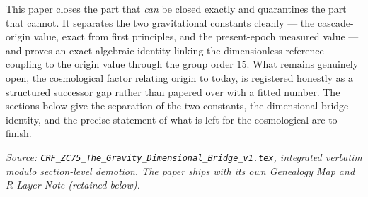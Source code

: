 \documentclass[12pt, a4paper]{article}
\renewcommand{\aEM}{\alpha_{\rm EM}}
\begin{document}
This paper closes the part that \emph{can} be closed exactly and quarantines
the part that cannot. It separates the two gravitational constants cleanly ---
the cascade-origin value, exact from first principles, and the present-epoch
measured value --- and proves an exact algebraic identity linking the
dimensionless reference coupling to the origin value through the group order
$15$. What remains genuinely open, the cosmological factor relating origin to
today, is registered honestly as a structured successor gap rather than
papered over with a fitted number. The sections below give the separation of
the two constants, the dimensional bridge identity, and the precise statement
of what is left for the cosmological arc to finish.
\label{sec:zc75}

\noindent
\textit{Source: \texttt{CRF\_ZC75\_The\_Gravity\_Dimensional\_Bridge\_v1.tex}, integrated verbatim modulo
section-level demotion. The paper ships with its own Genealogy Map
and R-Layer Note (retained below).}

\medskip

\sloppy


\begin{abstract}
\sloppy
GAP-ZC72-01 (ZC72) recorded the cosmological bridge
$\agrav^{R_0} \to G_N(\tnow)$ as a distinct, longer-range
open problem with no Born-chain analogue.
ZC75 resolves its algebraic (dimensional) component exactly
and registers the cosmological evolution as a structured
successor gap.

\textbf{DEF-ZC75-01} separates two objects that must not be
conflated: $\GRzero := \ln(2)\cdot c^2/D_0$ (Newton's constant
at the cascade origin, exact from Part~A/III) and $G_N(\tnow)$
(the measured value at the present epoch).
Their ratio $\GRzero/G_N(\tnow) = \Pnow/\Pzero$ is the
cosmological evolution factor.

\textbf{THM-ZC75-01} (Gravity Dimensional Bridge, Exact at $R_0$):
\[
  \agrav^{R_0} \;\times\; \ZN
  \;=\; \frac{\GRzero}{c^2}
  \;=\; \GammaCRF,
\]
an exact algebraic identity connecting the dimensionless $R_0$
gravity coupling to Newton's constant at the cascade origin
via the group order $|\Ztf| = 15$.

\textbf{FIND-ZC75-01} states the N15-suppression identity in
standalone form: $\agrav^{R_0} \times |\Ztf| = \GRzero/c^2$.
\textbf{FIND-ZC75-02} records the log-separation identity:
$\ln(\aEM^{R_0}/\agrav^{R_0}) = d_s \ln 2$.

\textbf{COR-ZC75-01} closes GAP-ZC72-01 at the algebraic level.
\textbf{GAP-ZC75-01} records the cosmological evolution factor
$P(\tnow)/P(0)$ as the structured successor gap.
\end{abstract}
\end{document}
